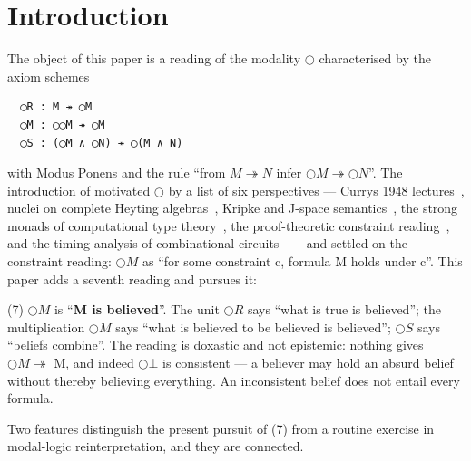 \section{Introduction}\label{1-introduction}

The object of this paper is a reading of the modality \ensuremath{\bigcirc}
characterised by the axiom schemes

\begin{lstlisting}
  ◯R : M ↠ ◯M
  ◯M : ◯◯M ↠ ◯M
  ◯S : (◯M ∧ ◯N) ↠ ◯(M ∧ N)
\end{lstlisting}

with Modus Ponens and the rule ``from \ensuremath{M \twoheadrightarrow N} infer \ensuremath{\bigcirc M \twoheadrightarrow \bigcirc N}''. The
introduction of \cite{FairtloughMendler1997} motivated \ensuremath{\bigcirc} by a list of six perspectives ---
Curry\textquotesingle s 1948 lectures~\cite{Curry1950,Curry1952}, nuclei on complete
Heyting algebras~\cite{Macnab1981,Johnstone1982,PicadoPultr2012}, Kripke
and J-space semantics~\cite{Kripke1965,Goldblatt1981,Simpson1994}, the
strong monads of computational type
theory~\cite{Moggi1991,BentonBiermanDePaiva1998,Kobayashi1997,
PfenningDavies2001},
the proof-theoretic constraint
reading~\cite{FairtloughMendlerWalton1997}, and the timing analysis of
combinational circuits~\cite{Mendler2000} --- and settled on the constraint reading: \ensuremath{\bigcirc M} as
``for some constraint c, formula M holds under c''. This paper adds a
seventh reading and pursues it:

(7) \ensuremath{\bigcirc M} is ``\textbf{M is believed}''. The unit \ensuremath{\bigcirc R} says ``what is true is
believed''; the multiplication \ensuremath{\bigcirc M} says ``what is believed to be believed
is believed''; \ensuremath{\bigcirc S} says ``beliefs combine''. The reading is doxastic and
not epistemic: nothing gives \ensuremath{\bigcirc M \twoheadrightarrow} M, and indeed \ensuremath{\bigcirc\bot} is consistent ---
a believer may hold an absurd belief without thereby believing
everything. An inconsistent belief does not entail every formula.

Two features distinguish the present pursuit of (7) from a routine
exercise in modal-logic reinterpretation, and they are connected.

